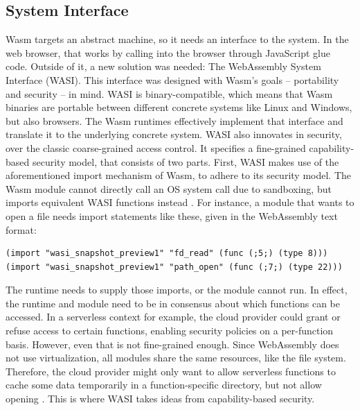 
\subsection{System Interface}

Wasm targets an abstract machine, so it needs an interface to the system. In the web browser, that works by calling into the browser through JavaScript glue code. Outside of it, a new solution was needed: The WebAssembly System Interface (WASI). This interface was designed with Wasm's goals -- portability and security -- in mind.
WASI is binary-compatible, which means that Wasm binaries are portable between different concrete systems like Linux and Windows, but also browsers. The Wasm runtimes effectively implement that interface and translate it to the underlying concrete system.
WASI also innovates in security, over the classic coarse-grained access control. It specifies a fine-grained capability-based security model, that consists of two parts. First, WASI makes use of the aforementioned import mechanism of Wasm, to adhere to its security model. The Wasm module cannot directly call an OS system call due to sandboxing, but imports equivalent WASI functions instead \cite{Clark2019}. For instance, a module that wants to open a file needs import statements like these, given in the WebAssembly text format:

\begin{verbatim}
(import "wasi_snapshot_preview1" "fd_read" (func (;5;) (type 8)))
(import "wasi_snapshot_preview1" "path_open" (func (;7;) (type 22)))
\end{verbatim}

The runtime needs to supply those imports, or the module cannot run. In effect, the runtime and module need to be in consensus about which functions can be accessed. In a serverless context for example, the cloud provider could grant or refuse access to certain functions, enabling security policies on a per-function basis. However, even that is not fine-grained enough. Since WebAssembly does not use virtualization, all modules share the same resources, like the file system. Therefore, the cloud provider might only want to allow serverless functions to cache some data temporarily in a function-specific  directory, but not allow opening . This is where WASI takes ideas from capability-based security.

